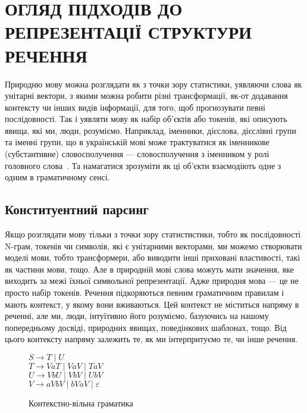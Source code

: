 \section{ОГЛЯД ПІДХОДІВ ДО РЕПРЕЗЕНТАЦІЇ СТРУКТУРИ РЕЧЕННЯ}
Природню мову можна розглядати як з точки зору статистики, уявляючи слова як унітарні вектори,
з якими можна робити різні трансформації, як-от додавання контексту чи інших видів
інформації, для того, щоб прогнозувати певні послідовності. Так і уявляти мову як
набір об'єктів або токенів, які описують явища, які ми, люди, розуміємо. Наприклад,
іменники, дієслова, дієслівні групи та іменні групи, що в українській мові
може трактуватися як іменникове (субстантивне) словосполучення –-- словосполучення 
з іменником у ролі головного слова~\cite{bib3}. Та намагатися зрозуміти як
ці об'єкти взаємодіють одне з одним в граматичному сенсі.

\subsection{Конституентний парсинг}
Якщо розглядати мову тільки з точки зору статистистики, тобто як послідовності N-грам, токенів
чи символів, які є унітарними векторами, ми можемо створювати моделі мови, тобто трансформери,
або виводити інші приховані властивості, такі як частини мови, тощо. Але в природній мові слова
можуть мати значення, яке виходить за межі їхньої символьної репрезентації. Адже природня
мова --- це не просто набір токенів. Речення підкоряються певним граматичним правилам і мають
контекст, у якому вони вживаються. Цей контекст не міститься напряму в реченні, але ми, люди,
інтуїтивно його розуміємо, базуючись на нашому попередньому досвіді, природних явищах, поведінкових
шаблонах, тощо. Від цього контексту напряму залежить те, як ми інтерпритуємо те, чи інше речення.

\begin{figure}[H]
  \begin{center}
    \noindent $S \rightarrow T \mid U$ \\
    \noindent $T \rightarrow VaT \mid VaV \mid TaV$ \\
    \noindent $U \rightarrow VbU \mid VbV \mid UbV$ \\
    \noindent $V \rightarrow aVbV \mid bVaV \mid \varepsilon$ \\
  \end{center}
  \caption{Контекстно-вільна граматика}
  \label{text:context_free_grammar}
\end{figure}

